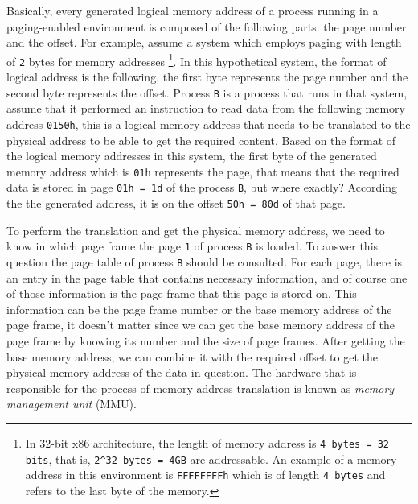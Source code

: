 Basically, every generated logical memory address of a process running
in a paging-enabled environment is composed of the following parts: the
page number and the offset. For example, assume a system which employs
paging with length of \lstinline!2! bytes for memory addresses
\footnote{In 32-bit x86 architecture, the length of memory address is
  \lstinline!4 bytes = 32 bits!, that is, \lstinline!2^32 bytes = 4GB!
  are addressable. An example of a memory address in this environment is
  \lstinline!FFFFFFFFh! which is of length \lstinline!4 bytes! and
  refers to the last byte of the memory.}. In this hypothetical system,
the format of logical address is the following, the first byte
represents the page number and the second byte represents the offset.
Process \lstinline!B! is a process that runs in that system, assume that
it performed an instruction to read data from the following memory
address \lstinline!0150h!, this is a logical memory address that needs
to be translated to the physical address to be able to get the required
content. Based on the format of the logical memory addresses in this
system, the first byte of the generated memory address which is
\lstinline!01h! represents the page, that means that the required data
is stored in page \lstinline!01h = 1d! of the process \lstinline!B!, but
where exactly? According the the generated address, it is on the offset
\lstinline!50h = 80d! of that page.

To perform the translation and get the physical memory address, we need
to know in which page frame the page \lstinline!1! of process
\lstinline!B! is loaded. To answer this question the page table of
process \lstinline!B! should be consulted. For each page, there is an
entry in the page table that contains necessary information, and of
course one of those information is the page frame that this page is
stored on. This information can be the page frame number or the base
memory address of the page frame, it doesn't matter since we can get the
base memory address of the page frame by knowing its number and the size
of page frames. After getting the base memory address, we can combine it
with the required offset to get the physical memory address of the data
in question. The hardware that is responsible for the process of memory
address translation is known as \emph{memory management unit} (MMU).

